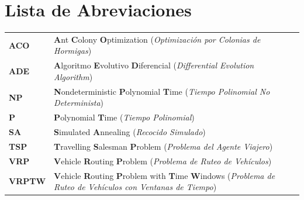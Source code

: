 \documentclass[12pt,titlepage,twoside,openright]{book}
\makeatletter
\def\cleardoublepage{\clearpage\if@twoside \ifodd\c@page\else
\hbox{}
\thispagestyle{empty}
\newpage
\if@twocolumn\hbox{}\newpage\fi\fi\fi}
\makeatother
\begin{document}

\setcounter{tocdepth}{3}
\setcounter{secnumdepth}{3}


\tableofcontents
\cleardoublepage
\listoffigures
{}
\cleardoublepage
\listoftables
{}
\cleardoublepage
\listofmyequations
{}
\cleardoublepage
\chapter*{Lista de Abreviaciones}

\vspace{0.5cm}
\begin{tabularx}{\textwidth}{>{\bfseries}l X}
	ACO   & \textbf{A}nt \textbf{C}olony \textbf{O}ptimization (\textit{Optimización por Colonias de Hormigas})                                                     \\
	ADE   & \textbf{A}lgoritmo \textbf{E}volutivo \textbf{D}iferencial (\textit{Differential Evolution Algorithm})                                                  \\
	NP    & \textbf{N}ondeterministic \textbf{P}olynomial \textbf{T}ime (\textit{Tiempo Polinomial No Determinista})                                                \\
	P     & \textbf{P}olynomial \textbf{T}ime (\textit{Tiempo Polinomial})                                                                                          \\
	SA    & \textbf{S}imulated \textbf{A}nnealing (\textit{Recocido Simulado})                                                                                      \\
	TSP   & \textbf{T}ravelling \textbf{S}alesman \textbf{P}roblem (\textit{Problema del Agente Viajero})                                                           \\
	VRP   & \textbf{V}ehicle \textbf{R}outing \textbf{P}roblem (\textit{Problema de Ruteo de Vehículos})                                                            \\
	VRPTW & \textbf{V}ehicle \textbf{R}outing \textbf{P}roblem with \textbf{T}ime \textbf{W}indows (\textit{Problema de Ruteo de Vehículos con Ventanas de Tiempo}) \\
\end{tabularx}
\end{document}
